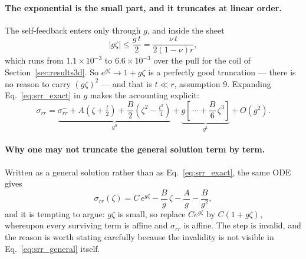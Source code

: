 \documentclass[11pt]{article}
\begin{document}
\paragraph{The exponential is the small part, and it truncates at linear order.}
The self-feedback enters only through $g$, and inside the sheet
\begin{equation}\label{eq:srr_orders}
    \left|g\zeta\right| \le \frac{g\,t}{2}
      = \frac{\nu\,t}{2\left(1-\nu\right)r},
\end{equation}
which runs from $1.1\times10^{-3}$ to $6.6\times10^{-3}$ over the pull for the
coil of Section~\ref{sec:results3d}. So $e^{g\zeta} \to 1 + g\zeta$ is a perfectly
good truncation --- there is no reason to carry $\left(g\zeta\right)^{2}$ --- and
that is $t \ll r$, assumption 9. Expanding
Eq.~\eqref{eq:srr_exact} in $g$ makes the accounting explicit:
\begin{equation}\label{eq:srr_g_expansion}
    \sigma_{rr}
      = \underbrace{\sigma_{rr}^{-}
        + A\left(\zeta+\tfrac t2\right)
        + \frac{B}{2}\left(\zeta^{2}-\tfrac{t^{2}}{4}\right)}_{g^{0}}
      + \underbrace{g\left[\,\cdots
        + \frac{B}{6}\,\zeta^{3}\right]}_{g^{1}}
      + O\!\left(g^{2}\right).
\end{equation}

\paragraph{Why one may not truncate the general solution term by term.} Written
as a general solution rather than as Eq.~\eqref{eq:srr_exact}, the same ODE gives
\begin{equation}\label{eq:srr_general}
    \sigma_{rr}\left(\zeta\right)
      = C\,e^{g\zeta} - \frac{B}{g}\,\zeta - \frac{A}{g} - \frac{B}{g^{2}},
\end{equation}
and it is tempting to argue: $g\zeta$ is small, so replace $C e^{g\zeta}$ by
$C\left(1+g\zeta\right)$, whereupon every surviving term is affine and
$\sigma_{rr}$ is affine. The step is invalid, and the reason is worth stating
carefully because the invalidity is not visible in
Eq.~\eqref{eq:srr_general} itself.
\end{document}
